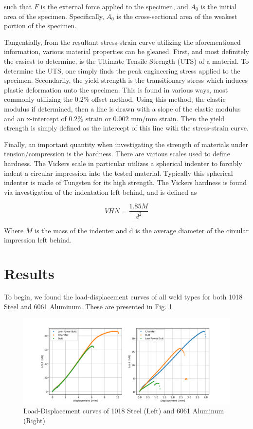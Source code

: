 \documentclass{article}
\begin{document}
such that $F$ is the external force applied to the specimen, and $A_0$ is the initial area of the specimen. Specifically, $A_0$ is the cross-sectional area of the weakest portion of the specimen. 

Tangentially, from the resultant stress-strain curve utilizing the aforementioned information, various material properties can be gleaned. First, and most definitely the easiest to determine, is the Ultimate Tensile Strength (UTS) of a material. To determine the UTS, one simply finds the peak engineering stress applied to the specimen. Secondarily, the yield strength is the transitionary stress which induces plastic deformation unto the specimen. This is found in various ways, most commonly utilizing the 0.2\% offset method. Using this method, the elastic modulus if determined, then a line is drawn with a slope of the elastic modulus and an x-intercept of 0.2\% strain or 0.002 mm/mm strain. Then the yield strength is simply defined as the intercept of this line with the stress-strain curve. 

Finally, an important quantity when investigating the strength of materials under tension/compression is the hardness. There are various scales used to define hardness. The Vickers scale in particular utilizes a spherical indenter to forcibly indent a circular impression into the tested material. Typically this spherical indenter is made of Tungsten for its high strength. The Vickers hardness is found via investigation of the indentation left behind, and is defined as

\begin{equation}
    VHN = \frac{1.85M}{d^2}
\end{equation}

Where $M$ is the mass of the indenter and d is the average diameter of the circular impression left behind. 

\newpage
\section{Results}
To begin, we found the load-displacement curves of all weld types for both 1018 Steel and 6061 Aluminum. These are presented in Fig. \ref{fig:q1}. 

\begin{figure}[!hp!]
    \centering
    \includegraphics[width=\linewidth]{plots/q1-1018-6061.png}
    \caption{Load-Displacement curves of 1018 Steel (Left) and 6061 Aluminum (Right)}
    \label{fig:q1}
\end{figure}
\end{document}
